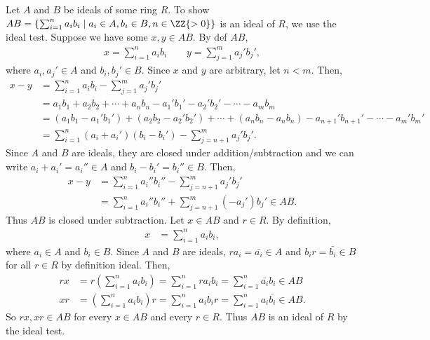 \documentclass{article}
\begin{document}
\begin{solution} %
  Let \( A \) and \( B \) be ideals of some ring \( R \).
  To show \( AB = \left\{\sum_{i=1}^n a_ib_i \mid a_i\in A, b_i\in B, n\in\ZZ{>0}\right\} \) is an ideal of \( R \), we use the ideal test.
  Suppose we have some \( x,y\in AB \).
  By def \( AB \), \begin{align*}
    x = \sum_{i=1}^{n} a_ib_i \qquad y = \sum_{j=1}^{m} a_j'b_j',
  \end{align*} where \( a_i,a_j'\in A \) and \( b_i,b_j'\in B \).
  Since \( x \) and \( y \) are arbitrary, let \( n<m \).
  Then, \begin{align*}
    x-y &= \sum_{i=1}^{n} a_ib_i - \sum_{j=1}^{m} a_j'b_j' \\
        &= a_1b_1 + a_2b_2 + \cdots + a_nb_n - a_1'b_1' - a_2'b_2' - \cdots - a_mb_m \\
        &= (a_1b_1-a_1'b_1') + (a_2b_2-a_2'b_2') + \cdots + (a_nb_n-a_nb_n) - a_{n+1}'b_{n+1}' - \cdots -a_m'b_m' \\
        &= \sum_{i=1}^n(a_i+a_i')(b_i-b_i') - \sum_{j=n+1}^{m} a_j'b_j'.
  \end{align*}
  Since \( A \) and \( B \) are ideals, they are closed under addition/subtraction and we can write \( a_i+a_i'=a_i''\in A \) and \( b_i-b_i' = b_i''\in B \).
  Then, \begin{align*}
    x-y &= \sum_{i=1}^{n}a_i''b_i'' - \sum_{j=n+1}^{m} a_j'b_j' \\
        &= \sum_{i=1}^{n}a_i''b_i'' + \sum_{j=n+1}^{m} (-a_j')b_j' \in AB.
  \end{align*}
  Thus \( AB \) is closed under subtraction.
  Let \( x\in AB \) and \( r\in R \). By definition, \begin{align*}
    x &= \sum_{i=1}^{n} a_ib_i,
  \end{align*} where \( a_i\in A \) and \( b_i\in B \).
  Since \( A \) and \( B \) are ideals, \( ra_i = \bar{a_i} \in A \) and \( b_i r = \bar{b_i} \in B \) for all \( r\in R \) by definition ideal.
  Then, \begin{align*}
    rx &= r\left(\sum_{i=1}^{n} a_ib_i\right) = \sum_{i=1}^{n} ra_ib_i = \sum_{i=1}^{n}\bar{a_i}b_i \in AB\\
    xr &= \left(\sum_{i=1}^{n} a_ib_i\right)r = \sum_{i=1}^{n} a_ib_ir = \sum_{i=1}^{n}a_i\bar{b_i} \in AB.
  \end{align*}
  So \( rx,xr\in AB \) for every \( x\in AB \) and every \( r\in R \). Thus \( AB \) is an ideal of \( R \) by the ideal test.
\end{solution}
\end{document}
